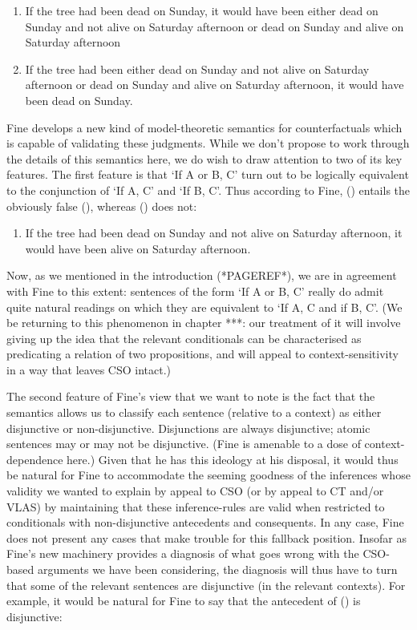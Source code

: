 \begin{enumerate}
\def\labelenumi{(\arabic{enumi})}
\setcounter{enumi}{58}
\item
  If the tree had been dead on Sunday, it would have been either dead on
  Sunday and not alive on Saturday afternoon or dead on Sunday and alive
  on Saturday afternoon
\item
  If the tree had been either dead on Sunday and not alive on Saturday
  afternoon or dead on Sunday and alive on Saturday afternoon, it would
  have been dead on Sunday.
\end{enumerate}

Fine develops a new kind of model-theoretic semantics for
counterfactuals which is capable of validating these judgments. While we
don't propose to work through the details of this semantics here, we do
wish to draw attention to two of its key features. The first feature is
that `If A or B, C' turn out to be logically equivalent to the
conjunction of `If A, C' and `If B, C'. Thus according to Fine, ()
entails the obviously false (), whereas () does not:

\begin{enumerate}
\def\labelenumi{(\arabic{enumi})}
\setcounter{enumi}{60}
\itemsep1pt\parskip0pt
\item
  If the tree had been dead on Sunday and not alive on Saturday
  afternoon, it would have been alive on Saturday afternoon.
\end{enumerate}

Now, as we mentioned in the introduction (*PAGEREF*), we are in
agreement with Fine to this extent: sentences of the form `If A or B, C'
really do admit quite natural readings on which they are equivalent to
`If A, C and if B, C'. (We be returning to this phenomenon in chapter
***: our treatment of it will involve giving up the idea that the
relevant conditionals can be characterised as predicating a relation of
two propositions, and will appeal to context-sensitivity in a way that
leaves CSO intact.)

The second feature of Fine's view that we want to note is the fact that
the semantics allows us to classify each sentence (relative to a
context) as either disjunctive or non-disjunctive. Disjunctions are
always disjunctive; atomic sentences may or may not be disjunctive.
(Fine is amenable to a dose of context-dependence here.) Given that he
has this ideology at his disposal, it would thus be natural for Fine to
accommodate the seeming goodness of the inferences whose validity we
wanted to explain by appeal to CSO (or by appeal to CT and/or VLAS) by
maintaining that these inference-rules are valid when restricted to
conditionals with non-disjunctive antecedents and consequents. In any
case, Fine does not present any cases that make trouble for this
fallback position. Insofar as Fine's new machinery provides a diagnosis
of what goes wrong with the CSO-based arguments we have been
considering, the diagnosis will thus have to turn that some of the
relevant sentences are disjunctive (in the relevant contexts). For
example, it would be natural for Fine to say that the antecedent of ()
is disjunctive:

